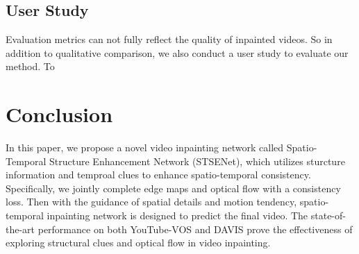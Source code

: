 \subsection{User Study}
Evaluation metrics can not fully reflect the quality of inpainted videos. So in addition to qualitative comparison, we also conduct a user study to evaluate our method. To


\section{Conclusion}
In this paper, we propose a novel video inpainting network called Spatio-Temporal Structure Enhancement Network (STSENet), which utilizes sturcture information and temproal clues to enhance spatio-temporal consistency. Specifically, we jointly complete edge maps and optical flow with a consistency loss. Then with the guidance of spatial details and motion tendency, spatio-temporal inpainting network is designed to predict the final video.
The state-of-the-art performance on both YouTube-VOS and DAVIS prove the effectiveness of exploring structural clues and optical flow in video inpainting.
 
